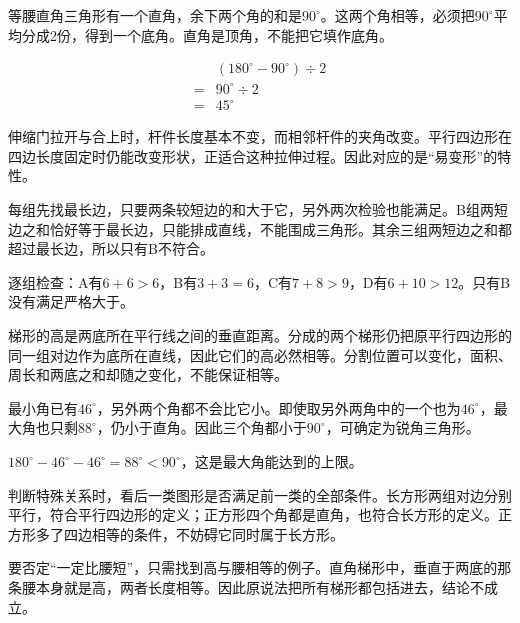 \documentclass[multi=snippet,border=0pt]{standalone}
\newenvironment{snippet}[3]{\begin{minipage}{#1bp}\color{answerred}\fontsize{#2}{#3}\selectfont\raggedright}{\end{minipage}}
\begin{document}
\begin{snippet}{505}{11.5}{14}等腰直角三角形有一个直角，余下两个角的和是\(90^\circ\)。这两个角相等，必须把\(90^\circ\)平均分成2份，得到一个底角。直角是顶角，不能把它填作底角。\par \[\begin{aligned}&(180^\circ-90^\circ)\div2\\={}&90^\circ\div2\\={}&45^\circ\end{aligned}\]\end{snippet}
\begin{snippet}{505}{11.5}{14}伸缩门拉开与合上时，杆件长度基本不变，而相邻杆件的夹角改变。平行四边形在四边长度固定时仍能改变形状，正适合这种拉伸过程。因此对应的是“易变形”的特性。\end{snippet}
\begin{snippet}{505}{11.5}{14}每组先找最长边，只要两条较短边的和大于它，另外两次检验也能满足。B组两短边之和恰好等于最长边，只能排成直线，不能围成三角形。其余三组两短边之和都超过最长边，所以只有B不符合。\par 逐组检查：A有\(6+6>6\)，B有\(3+3=6\)，C有\(7+8>9\)，D有\(6+10>12\)。只有B没有满足严格大于。\end{snippet}
\begin{snippet}{505}{11.5}{14}梯形的高是两底所在平行线之间的垂直距离。分成的两个梯形仍把原平行四边形的同一组对边作为底所在直线，因此它们的高必然相等。分割位置可以变化，面积、周长和两底之和却随之变化，不能保证相等。\end{snippet}
\begin{snippet}{505}{11.5}{14}最小角已有\(46^\circ\)，另外两个角都不会比它小。即使取另外两角中的一个也为\(46^\circ\)，最大角也只剩\(88^\circ\)，仍小于直角。因此三个角都小于\(90^\circ\)，可确定为锐角三角形。\par \(180^\circ-46^\circ-46^\circ=88^\circ<90^\circ\)，这是最大角能达到的上限。\end{snippet}
\begin{snippet}{505}{11.5}{14}判断特殊关系时，看后一类图形是否满足前一类的全部条件。长方形两组对边分别平行，符合平行四边形的定义；正方形四个角都是直角，也符合长方形的定义。正方形多了四边相等的条件，不妨碍它同时属于长方形。\end{snippet}
\begin{snippet}{505}{11.5}{14}要否定“一定比腰短”，只需找到高与腰相等的例子。直角梯形中，垂直于两底的那条腰本身就是高，两者长度相等。因此原说法把所有梯形都包括进去，结论不成立。\end{snippet}
\end{document}
